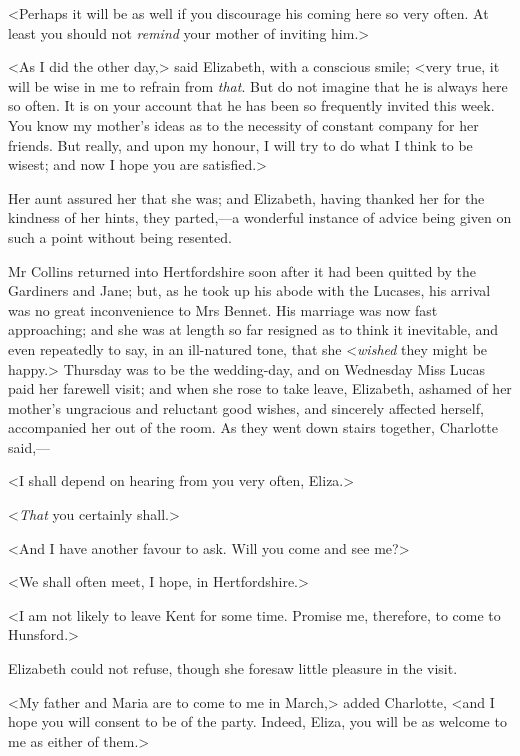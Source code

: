 <Perhaps it will be as well if you discourage his coming here so very often. At least you should not \textit{remind} your mother of inviting him.>

<As I did the other day,> said Elizabeth, with a conscious smile; <very true, it will be wise in me to refrain from \textit{that}. But do not imagine that he is always here so often. It is on your account that he has been so frequently invited this week. You know my mother's ideas as to the necessity of constant company for her friends. But really, and upon my honour, I will try to do what I think to be wisest; and now I hope you are satisfied.>

Her aunt assured her that she was; and Elizabeth, having thanked her for the kindness of her hints, they parted,—a wonderful instance of advice being given on such a point without being resented.

Mr Collins returned into Hertfordshire soon after it had been quitted by the Gardiners and Jane; but, as he took up his abode with the Lucases, his arrival was no great inconvenience to Mrs Bennet. His marriage was now fast approaching; and she was at length so far resigned as to think it inevitable, and even repeatedly to say, in an ill-natured tone, that she <\textit{wished} they might be happy.> Thursday was to be the wedding-day, and on Wednesday Miss Lucas paid her farewell visit; and when she rose to take leave, Elizabeth, ashamed of her mother's ungracious and reluctant good wishes, and sincerely affected herself, accompanied her out of the room. As they went down stairs together, Charlotte said,—

<I shall depend on hearing from you very often, Eliza.>

<\textit{That} you certainly shall.>

<And I have another favour to ask. Will you come and see me?>

<We shall often meet, I hope, in Hertfordshire.>

<I am not likely to leave Kent for some time. Promise me, therefore, to come to Hunsford.>

Elizabeth could not refuse, though she foresaw little pleasure in the visit.

<My father and Maria are to come to me in March,> added Charlotte, <and I hope you will consent to be of the party. Indeed, Eliza, you will be as welcome to me as either of them.>

